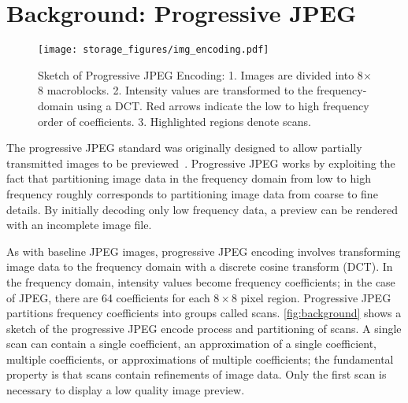 \section{Background: Progressive JPEG}
\begin{figure}[tb]
\begin{center}
\texttt{[image: storage\_figures/img\_encoding.pdf]}
\caption{Sketch of Progressive JPEG Encoding: 1. Images are divided into
8$\times$8 macroblocks.
2. Intensity values are transformed to the frequency-domain using a DCT\@. Red arrows
indicate the low to high frequency order of coefficients. 3. Highlighted
regions denote scans.}
\label{fig:background}
\end{center}
\end{figure}

The progressive JPEG standard was originally designed to allow partially transmitted images to be previewed~\cite{wallace1992jpeg}.
Progressive JPEG works by exploiting the fact that partitioning image data in the frequency domain from low to high frequency roughly corresponds to partitioning image data from coarse to fine details.
By initially decoding only low frequency data, a preview can be rendered with an incomplete image file.

As with baseline JPEG images, progressive JPEG encoding involves transforming image data to the frequency domain with a discrete cosine transform (DCT). 
In the frequency domain, intensity values become frequency coefficients; in the case of JPEG, there are 64 coefficients for each $8\times 8$ pixel region.
Progressive JPEG partitions frequency coefficients into groups called scans. \autoref{fig:background} shows a sketch of the progressive JPEG encode process and partitioning of scans.
A single scan can contain a single coefficient, an approximation of a single
coefficient, multiple coefficients, or approximations of multiple coefficients; the fundamental property is that scans contain refinements of image data.
Only the first scan is necessary to display a low quality image preview.
